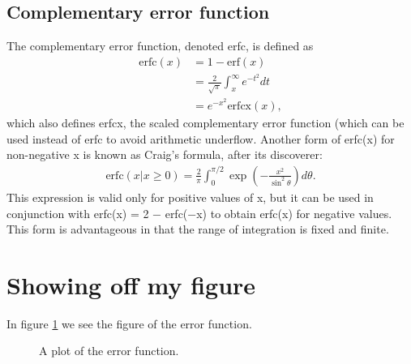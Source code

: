 \documentclass[a4paper]{article}
\begin{document}
\subsection{Complementary error function}
The complementary error function, denoted erfc, is defined as
\begin{align}
\text{erfc}(x) &= 1-\text{erf}(x)\\
&= \frac{2}{\sqrt{\pi}} \int_{x}^\infty e^{-t^2} dt\\
&= e^{-x^2} \text{erfcx}(x),
\end{align}
which also defines erfcx, the scaled complementary error function (which can be used instead of erfc to avoid arithmetic underflow. Another form of erfc(x) for non-negative x is known as Craig’s formula, after its discoverer:
\begin{align}
\text{erfc}(x | x \geq 0) = \frac{2}{\pi} \int_0^{\pi/2} \exp\left(-\frac{x^2}{\sin^2\theta}\right) d\theta.
\end{align}
This expression is valid only for positive values of x, but it can be used in conjunction with erfc(x) = 2 − erfc(−x) to obtain erfc(x) for negative values. This form is advantageous in that the range of integration is fixed and finite.
\section{Showing off my figure}
In figure \ref{my_figure} we see the figure of the error function.
\begin{figure}
  
  \caption{A plot of the error function.}
  \label{my_figure}
\end{figure}
\end{document}
